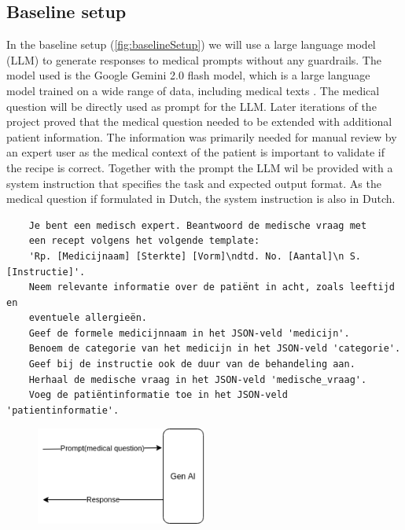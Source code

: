\subsection{Baseline setup}
In the baseline setup (\autoref{fig:baselineSetup}) we will use a large language model (LLM) to generate responses to medical prompts without any guardrails.
The model used is the Google Gemini 2.0 flash model, which is a large language model trained on a wide range of data, including medical texts \citep{saab2024capabilities}.
The medical question will be directly used as prompt for the LLM.
Later iterations of the project proved that the medical question needed to be extended with additional patient information.
The information was primarily needed for manual review by an expert user as the medical context of the patient is important to validate if the recipe is correct.
Together with the prompt the LLM wil be provided with a system instruction that specifies the task and expected output format.
As the medical question if formulated in Dutch, the system instruction is also in Dutch.
\begin{verbatim}
    Je bent een medisch expert. Beantwoord de medische vraag met
    een recept volgens het volgende template:
    'Rp. [Medicijnaam] [Sterkte] [Vorm]\ndtd. No. [Aantal]\n S. [Instructie]'.
    Neem relevante informatie over de patiënt in acht, zoals leeftijd en
    eventuele allergieën.
    Geef de formele medicijnnaam in het JSON-veld 'medicijn'.
    Benoem de categorie van het medicijn in het JSON-veld 'categorie'.
    Geef bij de instructie ook de duur van de behandeling aan.
    Herhaal de medische vraag in het JSON-veld 'medische_vraag'.
    Voeg de patiëntinformatie toe in het JSON-veld 'patientinformatie'.
\end{verbatim}

\begin{figure}[H]
    \includegraphics[width=0.5\textwidth]{figures/baselineSetup.png}
    \label{fig:baselineSetup}
\end{figure}


